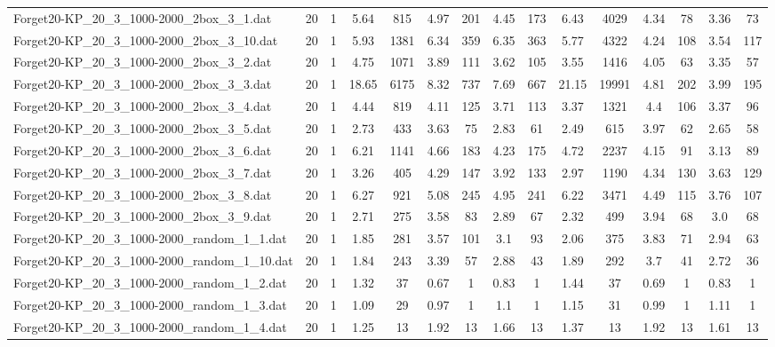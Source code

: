 \begin{table}[!ht]
{\begin{tabular}{lcccccccccccccc}
Forget20-KP\_20\_3\_1000-2000\_2box\_3\_1.dat & 20 & 1 & 5.64 & 815 & 4.97 & 201 & 4.45 & 173 & 6.43 & 4029 & 4.34 & 78 & 3.36 & 73 \\
Forget20-KP\_20\_3\_1000-2000\_2box\_3\_10.dat & 20 & 1 & 5.93 & 1381 & 6.34 & 359 & 6.35 & 363 & 5.77 & 4322 & 4.24 & 108 & 3.54 & 117 \\
Forget20-KP\_20\_3\_1000-2000\_2box\_3\_2.dat & 20 & 1 & 4.75 & 1071 & 3.89 & 111 & 3.62 & 105 & 3.55 & 1416 & 4.05 & 63 & 3.35 & 57 \\
Forget20-KP\_20\_3\_1000-2000\_2box\_3\_3.dat & 20 & 1 & 18.65 & 6175 & 8.32 & 737 & 7.69 & 667 & 21.15 & 19991 & 4.81 & 202 & 3.99 & 195 \\
Forget20-KP\_20\_3\_1000-2000\_2box\_3\_4.dat & 20 & 1 & 4.44 & 819 & 4.11 & 125 & 3.71 & 113 & 3.37 & 1321 & 4.4 & 106 & 3.37 & 96 \\
Forget20-KP\_20\_3\_1000-2000\_2box\_3\_5.dat & 20 & 1 & 2.73 & 433 & 3.63 & 75 & 2.83 & 61 & 2.49 & 615 & 3.97 & 62 & 2.65 & 58 \\
Forget20-KP\_20\_3\_1000-2000\_2box\_3\_6.dat & 20 & 1 & 6.21 & 1141 & 4.66 & 183 & 4.23 & 175 & 4.72 & 2237 & 4.15 & 91 & 3.13 & 89 \\
Forget20-KP\_20\_3\_1000-2000\_2box\_3\_7.dat & 20 & 1 & 3.26 & 405 & 4.29 & 147 & 3.92 & 133 & 2.97 & 1190 & 4.34 & 130 & 3.63 & 129 \\
Forget20-KP\_20\_3\_1000-2000\_2box\_3\_8.dat & 20 & 1 & 6.27 & 921 & 5.08 & 245 & 4.95 & 241 & 6.22 & 3471 & 4.49 & 115 & 3.76 & 107 \\
Forget20-KP\_20\_3\_1000-2000\_2box\_3\_9.dat & 20 & 1 & 2.71 & 275 & 3.58 & 83 & 2.89 & 67 & 2.32 & 499 & 3.94 & 68 & 3.0 & 68 \\
Forget20-KP\_20\_3\_1000-2000\_random\_1\_1.dat & 20 & 1 & 1.85 & 281 & 3.57 & 101 & 3.1 & 93 & 2.06 & 375 & 3.83 & 71 & 2.94 & 63 \\
Forget20-KP\_20\_3\_1000-2000\_random\_1\_10.dat & 20 & 1 & 1.84 & 243 & 3.39 & 57 & 2.88 & 43 & 1.89 & 292 & 3.7 & 41 & 2.72 & 36 \\
Forget20-KP\_20\_3\_1000-2000\_random\_1\_2.dat & 20 & 1 & 1.32 & 37 & 0.67 & 1 & 0.83 & 1 & 1.44 & 37 & 0.69 & 1 & 0.83 & 1 \\
Forget20-KP\_20\_3\_1000-2000\_random\_1\_3.dat & 20 & 1 & 1.09 & 29 & 0.97 & 1 & 1.1 & 1 & 1.15 & 31 & 0.99 & 1 & 1.11 & 1 \\
Forget20-KP\_20\_3\_1000-2000\_random\_1\_4.dat & 20 & 1 & 1.25 & 13 & 1.92 & 13 & 1.66 & 13 & 1.37 & 13 & 1.92 & 13 & 1.61 & 13 \\

\end{tabular}}
\end{table}
